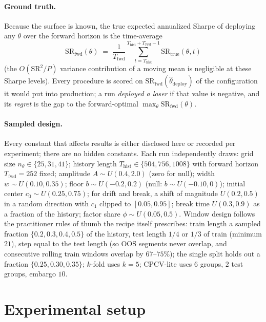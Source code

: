 \documentclass[11pt]{article}
\newcommand{\srtrue}{\mathrm{SR}_{\mathrm{true}}}
\newcommand{\srfwd}{\mathrm{SR}_{\mathrm{fwd}}}
\begin{document}
\paragraph{Ground truth.} Because the surface is known, the true expected
annualized Sharpe of deploying any $\theta$ over the forward horizon is the
time-average
\begin{equation}
\srfwd(\theta) \;=\; \frac{1}{T_{\mathrm{fwd}}}
\sum_{t=T_{\mathrm{hist}}}^{T_{\mathrm{hist}}+T_{\mathrm{fwd}}-1}
\srtrue(\theta,t)
\label{eq:fwd}
\end{equation}
(the $O(\mathrm{SR}^2/P)$ variance contribution of a moving mean is
negligible at these Sharpe levels). Every procedure is scored on
$\srfwd(\hat\theta_{\mathrm{deploy}})$ of the configuration it would put into
production; a run \emph{deployed a loser} if that value is negative, and its
\emph{regret} is the gap to the forward-optimal
$\max_\theta \srfwd(\theta)$.

\paragraph{Sampled design.} Every constant that affects results is either
disclosed here or recorded per experiment; there are no hidden constants.
Each run independently draws: grid size
$n_\theta \in \{25, 31, 41\}$; history length
$T_{\mathrm{hist}} \in \{504, 756, 1008\}$ with forward horizon
$T_{\mathrm{fwd}} = 252$ fixed; amplitude $A \sim U(0.4, 2.0)$ (zero for
null); width $w \sim U(0.10, 0.35)$; floor $b \sim U(-0.2, 0.2)$ (null:
$b \sim U(-0.10, 0)$); initial center $c_0 \sim U(0.25, 0.75)$; for drift and
break, a shift of magnitude $U(0.2, 0.5)$ in a random direction with $c_1$
clipped to $[0.05, 0.95]$; break time $U(0.3, 0.9)$ as a fraction of the
history; factor share $\phi \sim U(0.05, 0.5)$. Window design follows the
practitioner rules of thumb the recipe itself prescribes: train length a
sampled fraction $\{0.2, 0.3, 0.4, 0.5\}$ of the history, test length $1/4$
or $1/3$ of train (minimum $21$), step equal to the test length (so OOS
segments never overlap, and consecutive rolling train windows overlap by
$67$--$75\%$); the single split holds out a fraction
$\{0.25, 0.30, 0.35\}$; $k$-fold uses $k=5$; CPCV-lite uses $6$ groups,
$2$ test groups, embargo $10$.

\section{Experimental setup}
\label{sec:setup}
\end{document}
